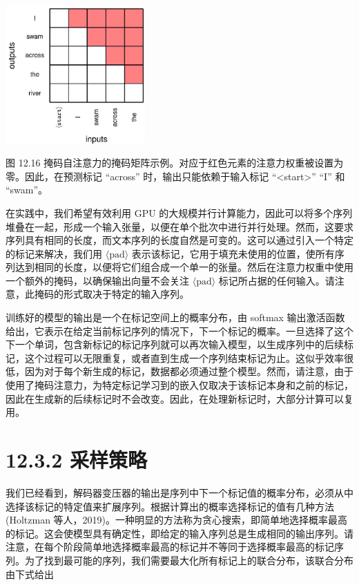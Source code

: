 \documentclass[10pt]{article}
\begin{document}
\begin{center}
\includegraphics[max width=0.4\textwidth]{images/0194e279-9b28-703a-88f4-c3ac21e2010d_404_960_345_591_585_0.jpg}
\end{center}
\hspace*{3em} 

图 12.16 掩码自注意力的掩码矩阵示例。对应于红色元素的注意力权重被设置为零。因此，在预测标记 “across” 时，输出只能依赖于输入标记 “<start>” “I” 和 “swam”。

在实践中，我们希望有效利用 GPU 的大规模并行计算能力，因此可以将多个序列堆叠在一起，形成一个输入张量，以便在单个批次中进行并行处理。然而，这要求序列具有相同的长度，而文本序列的长度自然是可变的。这可以通过引入一个特定的标记来解决，我们用 \(\langle \mathrm{{pad}}\rangle\) 表示该标记，它用于填充未使用的位置，使所有序列达到相同的长度，以便将它们组合成一个单一的张量。然后在注意力权重中使用一个额外的掩码，以确保输出向量不会关注 \(\langle \mathrm{{pad}}\rangle\) 标记所占据的任何输入。请注意，此掩码的形式取决于特定的输入序列。

训练好的模型的输出是一个在标记空间上的概率分布，由 softmax 输出激活函数给出，它表示在给定当前标记序列的情况下，下一个标记的概率。一旦选择了这个下一个单词，包含新标记的标记序列就可以再次输入模型，以生成序列中的后续标记，这个过程可以无限重复，或者直到生成一个序列结束标记为止。这似乎效率很低，因为对于每个新生成的标记，数据都必须通过整个模型。然而，请注意，由于使用了掩码注意力，为特定标记学习到的嵌入仅取决于该标记本身和之前的标记，因此在生成新的后续标记时不会改变。因此，在处理新标记时，大部分计算可以复用。

\section*{12.3.2 采样策略}

我们已经看到，解码器变压器的输出是序列中下一个标记值的概率分布，必须从中选择该标记的特定值来扩展序列。根据计算出的概率选择标记的值有几种方法(Holtzman 等人，2019)。一种明显的方法称为贪心搜索，即简单地选择概率最高的标记。这会使模型具有确定性，即给定的输入序列总是生成相同的输出序列。请注意，在每个阶段简单地选择概率最高的标记并不等同于选择概率最高的标记序列。为了找到最可能的序列，我们需要最大化所有标记上的联合分布，该联合分布由下式给出
\end{document}
